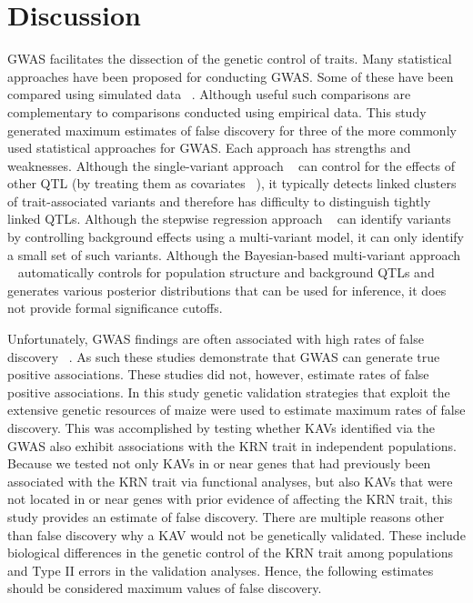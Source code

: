 \documentclass[10pt,letterpaper]{article}
\begin{document}

\section*{Discussion}
GWAS facilitates the dissection of the genetic control of traits. Many statistical approaches have been proposed for conducting GWAS. Some of these have been compared using simulated data ~\cite{Galesloot2014}. Although useful such comparisons are complementary to comparisons conducted using empirical data.  This study generated maximum estimates of false discovery for three of the more commonly used statistical approaches for GWAS. Each approach has strengths and weaknesses. Although the single-variant approach ~\cite{Balding2006} can control for the effects of other QTL (by treating them as covariates ~\cite{Kang2010}), it typically detects linked clusters of trait-associated variants and therefore has difficulty to distinguish tightly linked QTLs. Although the stepwise regression approach ~\cite{Segura2012} can identify variants by controlling background effects using a multi-variant model, it can only identify a small set of such variants. Although the Bayesian-based multi-variant approach ~\cite{Habier2011} automatically controls for population structure and background QTLs and generates various posterior distributions that can be used for inference, it does not provide formal significance cutoffs. 

Unfortunately, GWAS findings are often associated with high rates of false discovery ~\cite{Visscher2012}. As such these studies demonstrate that GWAS can generate true positive associations. These studies did not, however, estimate rates of false positive associations. In this study genetic validation strategies that exploit the extensive genetic resources of maize were used to estimate maximum rates of false discovery. This was accomplished by testing whether KAVs identified via the GWAS also exhibit associations with the KRN trait in independent populations. Because we tested not only KAVs in or near genes that had previously been associated with the KRN trait via functional analyses, but also KAVs that were not located in or near genes with prior evidence of affecting the KRN trait, this study provides an estimate of false discovery. There are multiple reasons other than false discovery why a KAV would not be genetically validated. These include biological differences in the genetic control of the KRN trait among populations and Type II errors in the validation analyses. Hence, the following estimates should be considered maximum values of false discovery.
\end{document}
